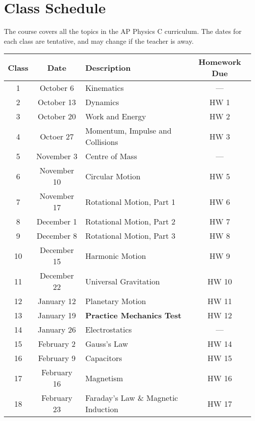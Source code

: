 \documentclass{../../oss-handout}
\begin{document}
\section{Class Schedule}
The course covers all the topics in the AP Physics C curriculum. The dates for
each class are tentative, and may change if the teacher is away.\\
\bgroup
\def\arraystretch{1.1}
\begin{center}
  \vspace{-.5in}
  \begin{tabular}{|c|c|p{4in}|c|}
    \hline
    \rowcolor{lightgray}
    \textbf{Class} & \textbf{Date} & \textbf{Description} &
    \textbf{Homework Due} \\
    \hline\hline
    1 & October 6 & Kinematics & --- \\
    \hline
    2 & October 13 & Dynamics   & HW 1\\
    \hline
    3 & October 20 & Work and Energy & HW 2 \\
    \hline
    4 & Octoer 27 & Momentum, Impulse and Collisions & HW 3 \\
    \hline
    5 & November 3 & Centre of Mass & --- \\
    \hline
    6 & November 10 & Circular Motion & HW 5 \\
    \hline
    7 & November 17 & Rotational Motion, Part 1 & HW 6 \\
    \hline
    8 & December 1 & Rotational Motion, Part 2 & HW 7 \\
    \hline
    9 & December 8 & Rotational Motion, Part 3 & HW 8 \\
    \hline
    10 & December 15 & Harmonic Motion & HW 9 \\
    \hline
    11 & December 22 & Universal Gravitation & HW 10 \\
    \hline
    12 & January 12 & Planetary Motion & HW 11 \\
    \hline
    \rowcolor{lightgray!50}
    13 & January 19 & \textbf{Practice Mechanics Test} & HW 12 \\
    \hline
    14 & January 26 & Electrostatics & --- \\
    \hline
    15 & February 2 & Gauss's Law & HW 14 \\
    \hline
    16 & February 9 & Capacitors & HW 15 \\
    \hline
    17 & February 16 & Magnetism  & HW 16\\
    \hline
    18 & February 23 & Faraday's Law \& Magnetic Induction & HW 17 \\

\end{tabular}
\end{center}
\end{document}
